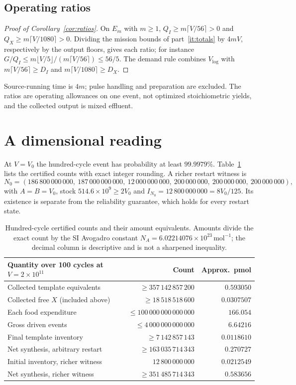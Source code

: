 \documentclass[11pt,a4paper]{article}
\theoremstyle{plain}
\theoremstyle{definition}
\theoremstyle{remark}
\newcommand{\Iv}{I}
\begin{document}
\subsection{Operating ratios}
\begin{proof}[Proof of Corollary~\ref{cor:ratios}]
On $E_m$ with $m\ge1$, $Q_I\ge m\lceil V/56\rceil>0$ and $Q_X\ge m\lceil V/1080\rceil>0$. Dividing the mission bounds of part~\ref{it:totals} by $4mV$, respectively by the output floors, gives each ratio; for instance $G/Q_I\le m\lfloor V/5\rfloor/(m\lceil V/56\rceil)\le56/5$. The demand rule combines $V_{\log}$ with $m\lceil V/56\rceil\ge D_I$ and $m\lceil V/1080\rceil\ge D_X$.
\end{proof}
Source-running time is $4m$; pulse handling and preparation are excluded. The ratios are operating allowances on one event, not optimized stoichiometric yields, and the collected output is mixed effluent.

\section{A dimensional reading}\label{sec:units}
At $V=V_0$ the hundred-cycle event has probability at least $99.9979\%$. Table~\ref{tab:counts} lists the certified counts with exact integer rounding. A richer restart witness is
\[
N_0=(186\,800\,000\,000,\ 187\,000\,000\,000,\ 12\,000\,000\,000,\ 200\,000\,000,\ 200\,000\,000,\ 200\,000\,000),
\]
with $A=B=V_0$, stock $514.6\times10^9\ge2V_0$ and $\Iv_{N_0}=12\,800\,000\,000=8V_0/125$. Its existence is separate from the reliability guarantee, which holds for every restart state.

\begin{table}[tb]
\centering\small
\begin{tabular}{lrr}
\toprule
Quantity over 100 cycles at $V=2\times10^{11}$ & Count & Approx.\ pmol\\
\midrule
Collected template equivalents & $\ge357\,142\,857\,200$ & $0.593050$\\
Collected free $X$ (included above) & $\ge18\,518\,518\,600$ & $0.0307507$\\
Each food expenditure & $\le100\,000\,000\,000\,000$ & $166.054$\\
Gross driven events & $\le4\,000\,000\,000\,000$ & $6.64216$\\
Final template inventory & $\ge7\,142\,857\,143$ & $0.0118610$\\
Net synthesis, arbitrary restart & $\ge163\,035\,714\,343$ & $0.270727$\\
Initial inventory, richer witness & $12\,800\,000\,000$ & $0.0212549$\\
Net synthesis, richer witness & $\ge351\,485\,714\,343$ & $0.583656$\\
\bottomrule
\end{tabular}
\caption{Hundred-cycle certified counts and their amount equivalents. Amounts divide the exact count by the SI Avogadro constant $N_A=6.02214076\times10^{23}\,\mathrm{mol}^{-1}$; the decimal column is descriptive and is not a sharpened inequality.}
\label{tab:counts}
\end{table}
\end{document}
